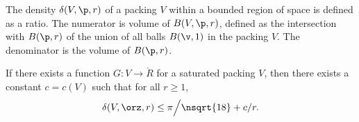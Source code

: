 


The density $\delta( V,\p,r)$ of a packing $ V$ within a bounded
region of space is defined as a ratio. The numerator is volume of
$B(V,\p,r)$, defined as the intersection with $B(\p,r)$ of the union
of all balls $B(\v,1)$ in the packing $V$.  The denominator is the volume of
$B(\p,r)$. 
%
%



\begin{lemma} 
\label{lemma:deltabound} %
If there exists a  
function $G: V\to\ring{R}$ for a saturated packing $ V$, then there
exists a constant $c=c(V)$ such that for all $r\ge1$,
\[  
\delta( V,\orz,r)
\le {\pi}\Big/{\nsqrt{18}} + c/r.
\] 
\end{lemma}




